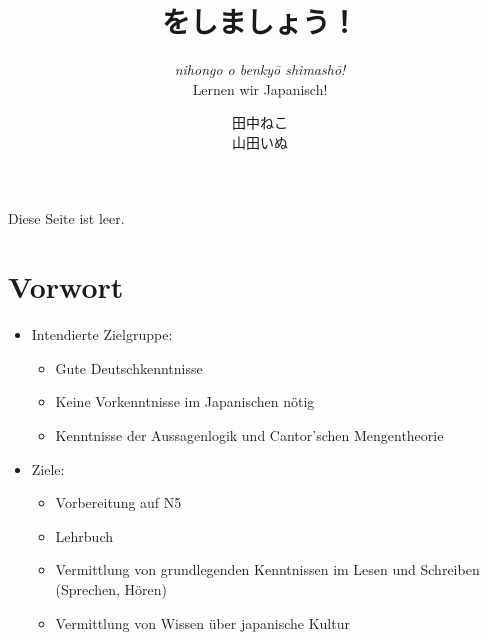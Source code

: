 \documentclass[a4paper,11pt]{scrbook}
\title{\ruby{日本語}{にほんご}を\ruby{勉強}{べんきょう}しましょう！}
\subtitle{\emph{nihongo o benkyō shimashō!}\\Lernen wir Japanisch!}
\date{}
\author{田中ねこ\\山田いぬ}
\begin{document}
  \begin{titlepage}
    \maketitle
  \end{titlepage}
  \restoregeometry

Diese Seite ist leer.
\tableofcontents

\chapter{Vorwort}
\begin{itemize}
  \item Intendierte Zielgruppe:
    \begin{itemize}
      \item Gute Deutschkenntnisse
      \item Keine Vorkenntnisse im Japanischen nötig
      \item Kenntnisse der Aussagenlogik und Cantor'schen Mengentheorie
    \end{itemize}
  \item Ziele:
    \begin{itemize}
      \item Vorbereitung auf N5
      \item Lehrbuch
      \item Vermittlung von grundlegenden Kenntnissen im Lesen und Schreiben (Sprechen, Hören)
      \item Vermittlung von Wissen über japanische Kultur
    \end{itemize}
\end{itemize}
\end{document}
